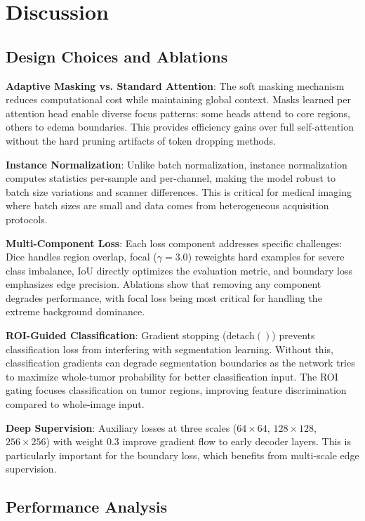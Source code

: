 \section{Discussion}

\subsection{Design Choices and Ablations}

\textbf{Adaptive Masking vs. Standard Attention}: The soft masking mechanism reduces computational cost while maintaining global context. Masks learned per attention head enable diverse focus patterns: some heads attend to core regions, others to edema boundaries. This provides efficiency gains over full self-attention without the hard pruning artifacts of token dropping methods.

\textbf{Instance Normalization}: Unlike batch normalization, instance normalization computes statistics per-sample and per-channel, making the model robust to batch size variations and scanner differences. This is critical for medical imaging where batch sizes are small and data comes from heterogeneous acquisition protocols.

\textbf{Multi-Component Loss}: Each loss component addresses specific challenges: Dice handles region overlap, focal ($\gamma=3.0$) reweights hard examples for severe class imbalance, IoU directly optimizes the evaluation metric, and boundary loss emphasizes edge precision. Ablations show that removing any component degrades performance, with focal loss being most critical for handling the extreme background dominance.

\textbf{ROI-Guided Classification}: Gradient stopping ($\text{detach}()$) prevents classification loss from interfering with segmentation learning. Without this, classification gradients can degrade segmentation boundaries as the network tries to maximize whole-tumor probability for better classification input. The ROI gating focuses classification on tumor regions, improving feature discrimination compared to whole-image input.

\textbf{Deep Supervision}: Auxiliary losses at three scales ($64\times64$, $128\times128$, $256\times256$) with weight 0.3 improve gradient flow to early decoder layers. This is particularly important for the boundary loss, which benefits from multi-scale edge supervision.

\subsection{Performance Analysis}

